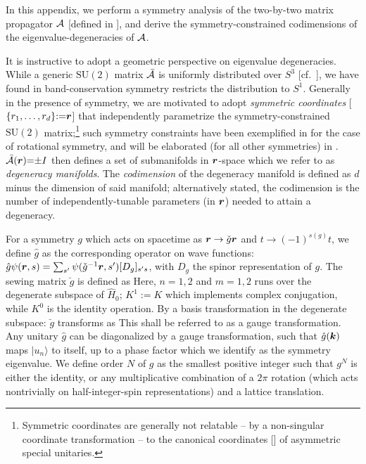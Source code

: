 \documentclass[aps, showpacs, twocolumn, notitlepage, superscriptaddress]{revtex4-1}
\begin{document}
In this appendix, we perform a symmetry analysis of the two-by-two matrix  propagator ${\cal A}$  [defined in ], and derive the symmetry-constrained codimensions of the eigenvalue-degeneracies of ${\cal A}$.


It is instructive to adopt a geometric perspective on eigenvalue degeneracies. While a generic $\text{SU}(2)$ matrix ${\cal \bar{A}}$ is uniformly distributed over $S^3$ [cf.\ ],  we have found in   band-conservation symmetry restricts the distribution to  $S^1$. Generally in the presence of symmetry, we are  motivated to adopt \textit{symmetric coordinates} [$\{r_1,\ldots,r_{d}\}{:}{=}\boldsymbol{r}$] that independently parametrize the symmetry-constrained $\text{SU}(2)$ matrix;\footnote{Symmetric coordinates are generally not relatable -- by a non-singular coordinate transformation -- to the canonical coordinates [] of asymmetric special unitaries.} such symmetry constraints have been exemplified in  for the case of rotational symmetry, and will be elaborated (for all other symmetries) in .  ${\cal \bar{A}}(\boldsymbol{r}){=}{\pm}I$ then defines a set of submanifolds in $\boldsymbol{r}$-space which we refer to as \textit{degeneracy manifolds}. The \textit{codimension} of the degeneracy manifold  is defined as $d$ minus the dimension of said manifold; alternatively stated, the codimension is the number of independently-tunable parameters (in $\boldsymbol{r}$) needed to attain a degeneracy.



For a symmetry $g$ which acts on spacetime as $\boldsymbol{r} \rightarrow \check{g} \boldsymbol{r}$ and $t\rightarrow (-1)^{s(g)}t$, 
we define $\hat{g}$ as the corresponding operator  on wave functions: $\hat{g} \psi(\boldsymbol{r},s)=\sum_{s'}\psi(\check{g}^{-1} \boldsymbol{r},s')[D_g]_{s's}$, with $D_g$ the spinor representation of $g$. The sewing matrix $\breve{g}$ is defined as 
Here, $n=1,2$ and $m=1,2$ runs over the degenerate subspace of $\hat{H}_0$; $K^1:=K$ which implements complex conjugation, while $K^0$ is the identity operation. By a basis transformation in the degenerate subspace: 
$\breve{g}$ transforms as
This shall be referred to as a gauge transformation.
Any unitary $\hat{g}$ can be diagonalized by a gauge transformation, such that  $\hat{g}(\boldsymbol{k})$ maps $|u_n\rangle$ to itself, up to a phase factor which we identify as the symmetry eigenvalue. We define order $N$ of $g$ as the smallest positive integer such that $g^N$ is either the identity, or any multiplicative combination of  a $2\pi$ rotation (which acts nontrivially on half-integer-spin representations) and a lattice translation.
\end{document}
